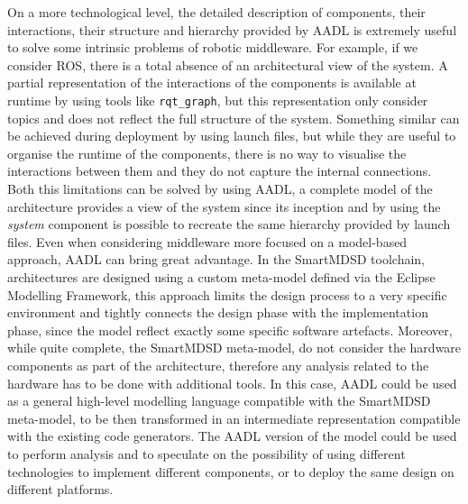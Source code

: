 On a more technological level, the detailed description of components, their interactions, their structure and hierarchy provided by AADL is extremely useful to solve some intrinsic problems of robotic middleware. For example, if we consider ROS, there is a total absence of an architectural view of the system. A partial representation of the interactions of the components is available at runtime by using tools like \texttt{rqt\_graph}, but this representation only consider topics and does not reflect the full structure of the system. Something similar can be achieved during deployment by using launch files, but while they are useful to organise the runtime of the components, there is no way to visualise the interactions between them and they do not capture the internal connections. Both this limitations can be solved by using AADL, a complete model of the architecture provides a view of the system since its inception and by using the \textit{system} component is possible to recreate the same hierarchy provided by launch files. Even when considering middleware more focused on a model-based approach, AADL can bring great advantage. In the SmartMDSD toolchain, architectures are designed using a custom meta-model defined via the Eclipse Modelling Framework, this approach limits the design process to a very specific environment and tightly connects the design phase with the implementation phase, since the model reflect exactly some specific software artefacts. Moreover, while quite complete, the SmartMDSD meta-model, do not consider the hardware components as part of the architecture, therefore any analysis related to the hardware has to be done with additional tools. In this case, AADL could be used as a general high-level modelling language compatible with the SmartMDSD meta-model, to be then transformed in an intermediate representation compatible with the existing code generators. The AADL version of the model could be used to perform analysis and to speculate on the possibility of using different technologies to implement different components, or to deploy the same design on different platforms.

